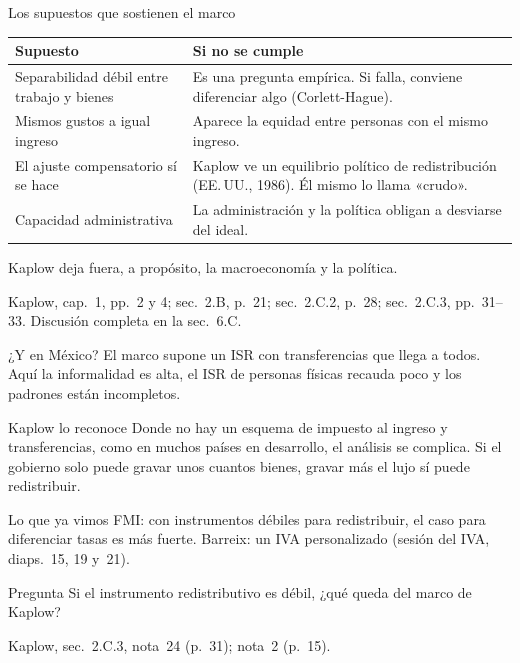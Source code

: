 \documentclass[aspectratio=169,11pt]{beamer}
\newcommand{\fuente}[1]{\par\vfill{\small\color{cGris}#1\par}}
\begin{document}
\begin{frame}{Los supuestos que sostienen el marco}
  \renewcommand{\arraystretch}{1.25}
  \begin{tabular}{@{}>{\raggedright\arraybackslash}p{}>{\raggedright\arraybackslash}p{}@{}}
    \toprule
    \textbf{Supuesto} & \textbf{Si no se cumple} \\
    \midrule
    Separabilidad débil entre trabajo y bienes & Es una pregunta empírica. Si falla, conviene diferenciar algo (Corlett-Hague). \\
    Mismos gustos a igual ingreso & Aparece la equidad entre personas con el mismo ingreso. \\
    El ajuste compensatorio sí se hace & Kaplow ve un equilibrio político de redistribución (EE.\,UU., 1986). Él mismo lo llama «crudo». \\
    Capacidad administrativa & La administración y la política obligan a desviarse del ideal. \\
    \bottomrule
  \end{tabular}
  \par\medskip
  \pause
  Kaplow deja fuera, a propósito, la macroeconomía y la política.
  \fuente{Kaplow, cap.~1, pp.~2 y 4; sec.~2.B, p.~21; sec.~2.C.2, p.~28; sec.~2.C.3, pp.~31--33. Discusión completa en la sec.~6.C.}
\end{frame}

\begin{frame}{¿Y en México?}
  El marco supone un ISR con transferencias que llega a todos. Aquí la informalidad es alta, el ISR de personas físicas recauda poco y los padrones están incompletos.
  \pause
  \begin{block}{Kaplow lo reconoce}
    Donde no hay un esquema de impuesto al ingreso y transferencias, como en muchos países en desarrollo, el análisis se complica. Si el gobierno solo puede gravar unos cuantos bienes, gravar más el lujo sí puede redistribuir.
  \end{block}
  \pause
  \begin{block}{Lo que ya vimos}
    FMI: con instrumentos débiles para redistribuir, el caso para diferenciar tasas es más fuerte. Barreix: un IVA personalizado (sesión del IVA, diaps.~15, 19 y~21).
  \end{block}
  \pause
  \begin{alertblock}{Pregunta}
    Si el instrumento redistributivo es débil, ¿qué queda del marco de Kaplow?
  \end{alertblock}
  \fuente{Kaplow, sec.~2.C.3, nota~24 (p.~31); nota~2 (p.~15).}
\end{frame}
\end{document}
